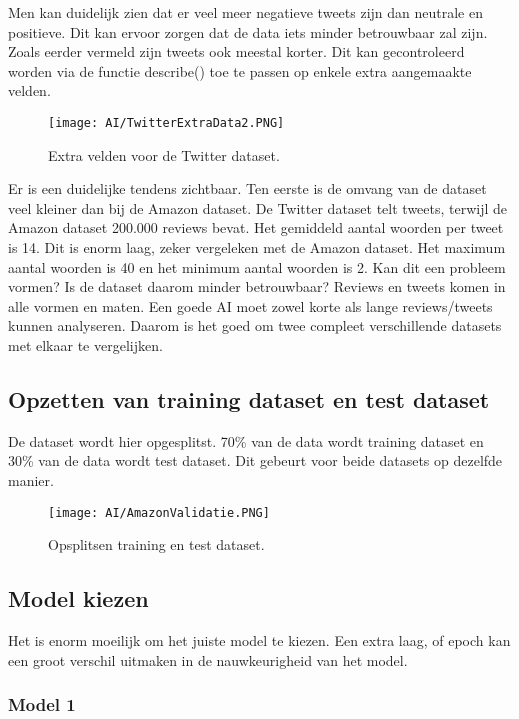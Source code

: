  Men kan duidelijk zien dat er veel meer negatieve tweets zijn dan neutrale en positieve. Dit kan ervoor zorgen dat de data iets minder betrouwbaar zal zijn. Zoals eerder vermeld zijn tweets ook meestal korter. Dit kan gecontroleerd worden via de functie describe() toe te passen op enkele extra aangemaakte velden.
 
  \begin{figure}[!htbp]
     \texttt{[image: AI/TwitterExtraData2.PNG]}
     \caption{\label{twitterextradata}Extra velden voor de Twitter dataset.}
 \end{figure}
 \FloatBarrier
 
 Er is een duidelijke tendens zichtbaar. Ten eerste is de omvang van de dataset veel kleiner dan bij de Amazon dataset. De Twitter dataset telt tweets, terwijl de Amazon dataset 200.000 reviews bevat. Het gemiddeld aantal woorden per tweet is 14. Dit is enorm laag, zeker vergeleken met de Amazon dataset. Het maximum aantal woorden is 40 en het minimum aantal woorden is 2. 
 Kan dit een probleem vormen? Is de dataset daarom minder betrouwbaar? Reviews en tweets komen in alle vormen en maten. Een goede AI moet zowel korte als lange reviews/tweets kunnen analyseren. Daarom is het goed om twee compleet verschillende datasets met elkaar te vergelijken. 

\subsection{Opzetten van training dataset en test dataset}
De dataset wordt hier opgesplitst. 70\% van de data wordt training dataset en 30\% van de data wordt test dataset. Dit gebeurt voor beide datasets op dezelfde manier.

\begin{figure}[!htbp]
    \texttt{[image: AI/AmazonValidatie.PNG]}
    \caption{\label{amazonopsplitsing}Opsplitsen training en test dataset.}
\end{figure}
\FloatBarrier

\subsection{Model kiezen}
\label{proofofconceptdatamodel}
Het is enorm moeilijk om het juiste model te kiezen. Een extra laag, of epoch kan een groot verschil uitmaken in de nauwkeurigheid van het model. 

\subsubsection{Model 1}

